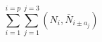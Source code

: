 \begin{equation}
\sum_{i=1}^{i=p} \sum_{j=1}^{j=3}
(N_i, \bar{N}_{i \pm a_j})
\label{scalars}
\end{equation}

